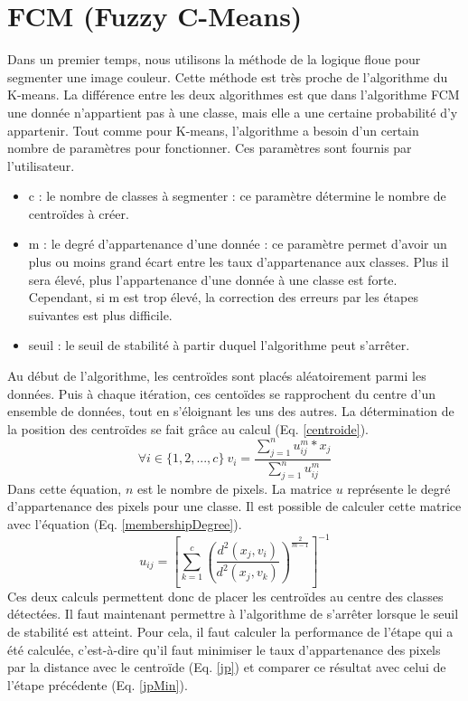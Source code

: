\documentclass[a4paper,11pt]{article}
\begin{document}
\section{FCM (Fuzzy C-Means)}
Dans un premier temps, nous utilisons la méthode de la logique floue pour segmenter une image couleur. 
Cette méthode est très proche de l'algorithme du K-means. La différence entre les deux algorithmes
est que dans l'algorithme FCM une donnée n'appartient pas à une classe, mais elle a une certaine
probabilité d'y appartenir. Tout comme pour K-means, l'algorithme a besoin d'un certain nombre de
paramètres pour fonctionner. Ces paramètres sont fournis par l'utilisateur.
\begin{itemize}
  \item c : le nombre de classes à segmenter : ce paramètre détermine le nombre de centroïdes à créer.
  \item m : le degré d'appartenance d'une donnée : ce paramètre permet d'avoir un plus ou moins grand écart
  entre les taux d'appartenance aux classes. Plus il sera élevé, plus l'appartenance d'une donnée à une classe
  est forte. Cependant, si m est trop élevé, la correction des erreurs par les étapes suivantes est plus difficile.
  \item seuil : le seuil de stabilité à partir duquel l'algorithme peut s’arrêter.
\end{itemize}
Au début de l'algorithme, les centroïdes sont placés aléatoirement parmi les données. Puis à chaque itération,
ces centoïdes se rapprochent du centre d'un ensemble de données, tout en s'éloignant les uns des autres. La détermination
de la position des centroïdes se fait grâce au calcul (Eq. \ref{centroide}).
\begin{equation}
  \label{centroide}
  \forall i \in \{1, 2, ..., c\} \ v_i = \frac{\sum_{j=1}^{n} u_{ij}^m * x_j}{\sum_{j=1}^{n} u_{ij}^m}
\end{equation}
Dans cette équation, $n$ est le nombre de pixels. La matrice $u$ représente
le degré d'appartenance des pixels pour une classe. Il est possible de calculer cette matrice avec l'équation
(Eq. \ref{membershipDegree}).
\begin{equation}
 \label{membershipDegree}
  u_{ij}=\left[\sum_{k=1}^{c} \left(\frac{d^2(x_j, v_i)}{d^2(x_j, v_k)}\right)^{\frac{2}{m-1}}\right]^{-1}
\end{equation}
Ces deux calculs permettent donc de placer les centroïdes au centre des classes détectées. Il faut maintenant permettre
à l'algorithme de s’arrêter lorsque le seuil de stabilité est atteint. Pour cela, il faut calculer la performance
de l'étape qui a été calculée, c'est-à-dire qu'il faut minimiser le taux d'appartenance des pixels par la distance
avec le centroïde (Eq. \ref{jp}) et comparer ce résultat avec celui de l'étape précédente (Eq. \ref{jpMin}).
\end{document}
